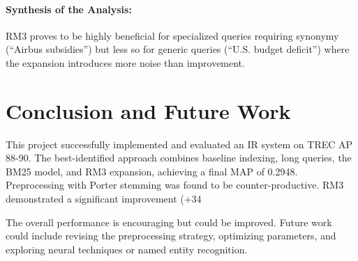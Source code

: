 \documentclass[11pt,a4paper]{article}
\begin{document}
\paragraph{Synthesis of the Analysis:}  
RM3 proves to be highly beneficial for specialized queries requiring  
synonymy (“Airbus subsidies”) but less so for generic queries  
(“U.S. budget deficit”) where the expansion introduces more noise than improvement.


\section{Conclusion and Future Work}
\label{sec:conclusion}
This project successfully implemented and evaluated an IR system on TREC AP 88-90. The best-identified approach combines baseline indexing, long queries, the BM25 model, and RM3 expansion, achieving a final MAP of 0.2948. Preprocessing with Porter stemming was found to be counter-productive. RM3 demonstrated a significant improvement (+34%

The overall performance is encouraging but could be improved. Future work could include revising the preprocessing strategy, optimizing parameters, and exploring neural techniques or named entity recognition.


\nocite{*}
\clearpage
\tableofcontents
\end{document}

